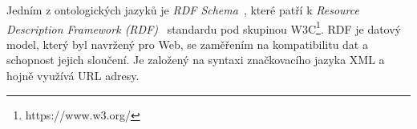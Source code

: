 Jedním z ontologických jazyků je \emph{RDF Schema}~\cite{rdf-schema},
které patří k \emph{Resource Description Framework (RDF)}~\cite{rdf} standardu pod skupinou W3C\footnote{https://www.w3.org/}.
RDF je datový model, který byl navržený pro Web, se zaměřením na kompatibilitu dat a schopnost jejich sloučení.
Je založený na syntaxi značkovacího jazyka XML a hojně využívá URL adresy.
